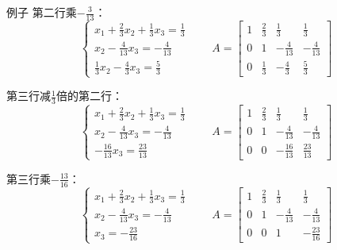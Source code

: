 \documentclass{beamer}
\begin{document}
\begin{frame}{例子}
    第二行乘$-\frac{3}{13}$：
    \begin{equation*}
        \left\{
            \begin{array}{l}
                x_1 + \frac{2}{3}x_2 + \frac{1}{3}x_3 = \frac{1}{3}\\
                x_2 - \frac{4}{13}x_3 = -\frac{4}{13}\\
                \frac{1}{3}x_2 - \frac{4}{3}x_3 = \frac{5}{3}
            \end{array}
        \right. \qquad 
        A=\begin{bmatrix}
            1 & \frac{2}{3} & \frac{1}{3} & \frac{1}{3}\\
            0 & 1 & -\frac{4}{13} & -\frac{4}{13}\\
            0 & \frac{1}{3} & -\frac{4}{3} & \frac{5}{3}
        \end{bmatrix}
    \end{equation*}

    第三行减$\frac{1}{3}$倍的第二行：
    \begin{equation*}
        \left\{
            \begin{array}{l}
                x_1 + \frac{2}{3}x_2 + \frac{1}{3}x_3 = \frac{1}{3}\\
                x_2 - \frac{4}{13}x_3 = -\frac{4}{13}\\
                - \frac{16}{13}x_3 = \frac{23}{13}
            \end{array}
        \right. \qquad 
        A=\begin{bmatrix}
            1 & \frac{2}{3} & \frac{1}{3} & \frac{1}{3}\\
            0 & 1 & -\frac{4}{13} & -\frac{4}{13}\\
            0 & 0 & -\frac{16}{13} & \frac{23}{13}
        \end{bmatrix}
    \end{equation*}

    第三行乘$-\frac{13}{16}$：
    \begin{equation*}
        \left\{
            \begin{array}{l}
                x_1 + \frac{2}{3}x_2 + \frac{1}{3}x_3 = \frac{1}{3}\\
                x_2 - \frac{4}{13}x_3 = -\frac{4}{13}\\
                x_3 = -\frac{23}{16}
            \end{array}
        \right. \qquad 
        A=\begin{bmatrix}
            1 & \frac{2}{3} & \frac{1}{3} & \frac{1}{3}\\
            0 & 1 & -\frac{4}{13} & -\frac{4}{13}\\
            0 & 0 & 1 & -\frac{23}{16}
        \end{bmatrix}
    \end{equation*}
\end{frame}
\end{document}
